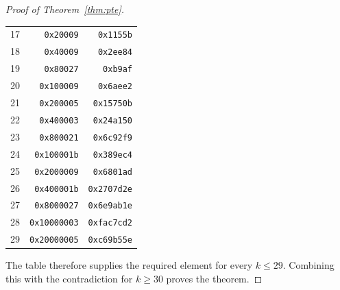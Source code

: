 \documentclass[11pt]{article}
\begin{document}
\begin{proof}[Proof of Theorem~\ref{thm:pte}]
\begin{center}
\begin{tabular}{rrr}
17 & \texttt{0x20009} & \texttt{0x1155b}\\
18 & \texttt{0x40009} & \texttt{0x2ee84}\\
19 & \texttt{0x80027} & \texttt{0xb9af}\\
20 & \texttt{0x100009} & \texttt{0x6aee2}\\
21 & \texttt{0x200005} & \texttt{0x15750b}\\
22 & \texttt{0x400003} & \texttt{0x24a150}\\
23 & \texttt{0x800021} & \texttt{0x6c92f9}\\
24 & \texttt{0x100001b} & \texttt{0x389ec4}\\
25 & \texttt{0x2000009} & \texttt{0x6801ad}\\
26 & \texttt{0x400001b} & \texttt{0x2707d2e}\\
27 & \texttt{0x8000027} & \texttt{0x6e9ab1e}\\
28 & \texttt{0x10000003} & \texttt{0xfac7cd2}\\
29 & \texttt{0x20000005} & \texttt{0xc69b55e}\\
\end{tabular}
\end{center}
The table therefore supplies the required element for every $k\le29$.
Combining this with the contradiction for $k\ge30$ proves the theorem.
\end{proof}
\end{document}
